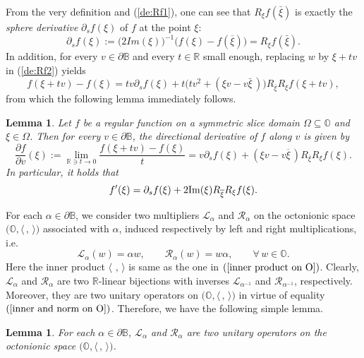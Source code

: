 \documentclass{amsart}
\newtheorem{lemma}[theorem]{Lemma}
\theoremstyle{definition}
\theoremstyle{remark}
\numberwithin{equation}{section}
\begin{document}
From the very definition and (\ref{de:Rf1}), one can see that $R_{\xi}f(\bar{\xi})$ is exactly the \textit{sphere derivative} $\partial_sf(\xi)$  of $f$ at the point $\xi$:
$$\partial_sf(\xi):=\big(2Im(\xi)\big)^{-1}\big(f(\xi)-f(\overline{\xi})\big)=R_{\xi}f(\bar{\xi}).$$
In addition, for every $v\in\partial \mathbb B$ and every $t\in\mathbb R$ small enough, replacing $w$ by $\xi+tv$ in (\ref{de:Rf2}) yields
$$f(\xi+tv)-f(\xi)=tv\partial_sf(\xi)+t\big(tv^2+(\xi v-v\bar{\xi}\,)\big)R_{\overline{\xi}}R_{\xi}f(\xi+tv),$$
from which the following lemma immediately follows.
\begin{lemma}\label{D-derivative}
Let $f$ be a regular function on a  symmetric slice domain $\Omega\subseteq \mathbb O$ and $\xi\in\Omega$. Then for every $v\in\partial \mathbb B$, the directional derivative of $f$ along $v$ is given by
\begin{equation}\label{eq:D-derivative}
\frac{\partial f}{\partial v}(\xi):=\lim\limits_{\mathbb R\ni t\rightarrow 0}\frac{f(\xi+tv)-f(\xi)}{t}=v\partial_sf(\xi)+(\xi v-v\overline{\xi}\,)R_{\overline{\xi}}R_{\xi}f(\xi).
\end{equation}
In particular, it holds that
\begin{equation}\label{derivative-relation}
f'(\xi)=\partial_sf(\xi)+2{\rm{Im}}(\xi)R_{\overline{\xi}}R_{\xi}f(\xi).
\end{equation}
\end{lemma}

For each $\alpha\in\partial \mathbb B$, we consider two multipliers $\mathcal{L}_{\alpha}$ and $\mathcal{R}_{\alpha}$ on the octonionic space $\big(\mathbb O, \langle \,,\,\rangle\big)$ associated with $\alpha$, induced respectively by left and right multiplications, i.e.
$$\mathcal{L}_{\alpha}(w)=\alpha w,\qquad \mathcal{R}_{\alpha}(w)= w\alpha, \qquad \forall\, w\in\mathbb O.$$
Here the inner product $\langle \,\,,\,\rangle$ is same as the one in $(\ref{inner product on O})$.
Clearly, $\mathcal{L}_{\alpha}$ and $\mathcal{R}_{\alpha}$ are two $\mathbb R$-linear bijections with inverses $\mathcal{L}_{\alpha^{-1}}$ and $\mathcal{R}_{\alpha^{-1}}$, respectively. Moreover, they are two unitary operators on $\big(\mathbb O, \langle \,,\,\rangle\big)$ in virtue of equality $(\ref{inner and norm on O})$. Therefore, we have the following simple lemma.

\begin{lemma}\label{unitary multipliers}
For each $\alpha\in\partial \mathbb B$, $\mathcal{L}_{\alpha}$ and $\mathcal{R}_{\alpha}$ are two unitary operators on the octonionic space $\big(\mathbb O, \langle \,,\,\rangle\big)$.
\end{lemma}
\end{document}
